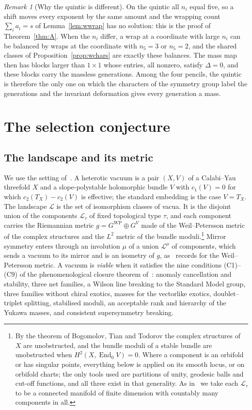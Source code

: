 \documentclass[11pt]{amsart}
\theoremstyle{definition}
\theoremstyle{remark}
\newtheorem{remark}[theorem]{Remark}
\newcommand{\cL}{\mathcal{L}}
\newcommand{\End}{\operatorname{End}}
\newcommand{\WP}{\mathrm{WP}}
\begin{document}
\begin{remark}[Why the quintic is different]\label{rem:wquintic}
On the quintic all $n_i$ equal five, so a shift moves every exponent by the
same amount and the wrapping count $\sum_ia_i=s$ of
Lemma~\ref{lem:wwrap} has no solution: this is the proof of
Theorem~\ref{thm:A}. When the $n_i$ differ, a wrap at a coordinate with
large $n_i$ can be balanced by wraps at the coordinate with $n_5=3$ or
$n_5=2$, and the shared classes of Proposition~\ref{prop:wchars} are
exactly these balances. The mass map then has blocks larger than $1\times1$
whose entries, all nonzero, satisfy $\Delta=0$, and these blocks carry the
massless generations. Among the four pencils, the quintic is therefore the
only one on which the characters of the symmetry group label the
generations and the invariant deformation gives every generation a mass.
\end{remark}

\section{The selection conjecture}\label{sec:selection}

\subsection{The landscape and its metric}

We use the setting of~\cite{Bha26a}. A heterotic vacuum is a pair $(X,V)$
of a Calabi--Yau threefold $X$ and a slope-polystable holomorphic bundle $V$
with $c_1(V)=0$ for which $c_2(T_X)-c_2(V)$ is effective; the standard
embedding is the case $V=T_X$. The landscape $\cL$ is the set of
isomorphism classes of vacua. It is the disjoint union of the components
$\cL_\tau$ of fixed topological type $\tau$, and each component carries the
Riemannian metric $g=G^{\WP}\oplus G^V$ made of the Weil--Petersson metric
of the complex structures and the $L^2$ metric of the bundle
moduli.\footnote{By the theorem of Bogomolov, Tian and Todorov the complex
structures of $X$ are unobstructed, and the bundle moduli of a stable
bundle are unobstructed when $H^2(X,\End_0V)=0$. Where a component is an
orbifold or has singular points, everything below is applied on its smooth
locus, or on orbifold charts; the only tools used are partitions of unity,
geodesic balls and cut-off functions, and all three exist in that
generality. As in~\cite{Bha26a} we take each $\cL_\tau$ to be a connected
manifold of finite dimension with countably many components in all.}
Mirror symmetry enters through an involution $\mu$ of a union $\cL^\mu$ of
components, which sends a vacuum to its mirror and is an isometry of $g$,
as~\cite{Bha26a} records for the Weil--Petersson metric. A vacuum is
\emph{viable} when it satisfies the nine conditions (C1)--(C9) of the
phenomenological closure theorem of~\cite{Bha26a}: anomaly cancellation and
stability, three net families, a Wilson line breaking to the Standard Model
group, three families without chiral exotics, masses for the vectorlike
exotics, doublet--triplet splitting, stabilised moduli, an acceptable rank
and hierarchy of the Yukawa masses, and consistent supersymmetry breaking.
\end{document}
